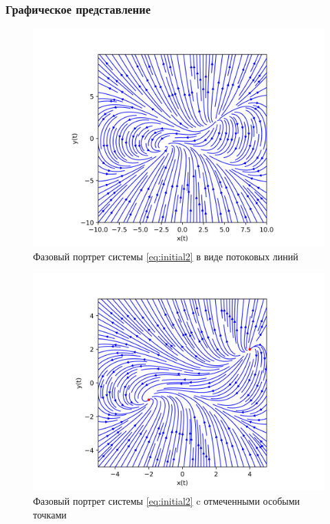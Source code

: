 \documentclass{article}
\begin{document}
\subsubsection{Графическое представление}
\begin{figure}[h!]
    \centering
    \includegraphics[width=0.78\paperwidth]{graph1_2.png}
    \caption{Фазовый портрет системы \ref{eq:initial2} в виде потоковых линий}
    \label{fig:stream2_1}
\end{figure}
\begin{figure}[h!]
    \centering
    \includegraphics[width=0.78\paperwidth]{graph2_2.png}
    \caption{Фазовый портрет системы \ref{eq:initial2} c отмеченными особыми точками}
    \label{fig:stream2_2}
\end{figure}
\end{document}

